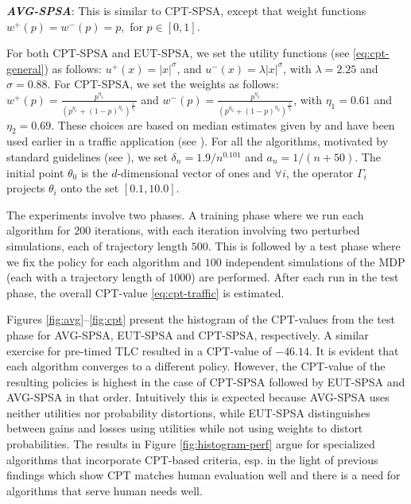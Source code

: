{\bf\em AVG-SPSA}: This is similar to CPT-SPSA, except that weight functions $w^+(p)=w^-(p)=p,$ for $p\in [0,1]$. 

For both CPT-SPSA and EUT-SPSA, we set the utility functions (see \eqref{eq:cpt-general}) as follows:
$u^+(x) =  |x|^{\sigma}$, and  $u^-(x) = \lambda |x|^{\sigma}$, with $\lambda = 2.25$ and $\sigma = 0.88$.
For CPT-SPSA, we set the weights as follows:
$w^+(p) = \frac{p^{\eta_1}}{{(p^{\eta_1}+ (1-p)^{\eta_1})}^{\frac{1}{\eta_1}}}$ and  
$w^-(p) = \frac{p^{\eta_2}}{{(p^{\eta_2}+ (1-p)^{\eta_2})}^{\frac{1}{\eta_2}}}$, with
$\eta_1 = 0.61$ and $\eta_2 = 0.69$. These choices are based on median estimates given by \cite{tversky1992advances} and have been used earlier in a traffic application (see \cite{gao2010adaptive}).
For all the algorithms,
 motivated by standard guidelines (see \citealt{spall2005introduction}),
 we set $\delta_n = 1.9/n^{0.101}$ and $a_n = 1/(n+50)$. The initial point $\theta_0$ is the $d$-dimensional vector of ones and $\forall i$, the operator $\Gamma_i$ projects $\theta_i$ onto the set $[0.1, 10.0]$.
    
The experiments involve two phases.
A training phase where we run each algorithm for $200$ iterations, with each iteration involving two perturbed simulations, each of trajectory length $500$. This is followed by a test phase where we fix the policy for each algorithm and $100$ independent simulations of the MDP (each with a trajectory length of $1000$) are performed. After each run in the test phase, the overall CPT-value \eqref{eq:cpt-traffic} is estimated. 

Figures \ref{fig:avg}--\ref{fig:cpt} present the histogram of the CPT-values from the test phase for AVG-SPSA, EUT-SPSA and CPT-SPSA, respectively.  A similar exercise for pre-timed TLC resulted in a CPT-value of $-46.14$. It is evident that each algorithm converges to a different policy. However, the CPT-value of the resulting policies is highest in the case of CPT-SPSA followed by EUT-SPSA and AVG-SPSA in that order. Intuitively this is expected because AVG-SPSA uses neither utilities nor probability distortions, while EUT-SPSA distinguishes between gains and losses using utilities while not using weights to distort probabilities.
The results in Figure \ref{fig:histogram-perf} argue for specialized algorithms that incorporate CPT-based criteria, esp. in the light of previous findings which show CPT matches human evaluation well and there is a need for algorithms that serve human needs well.


